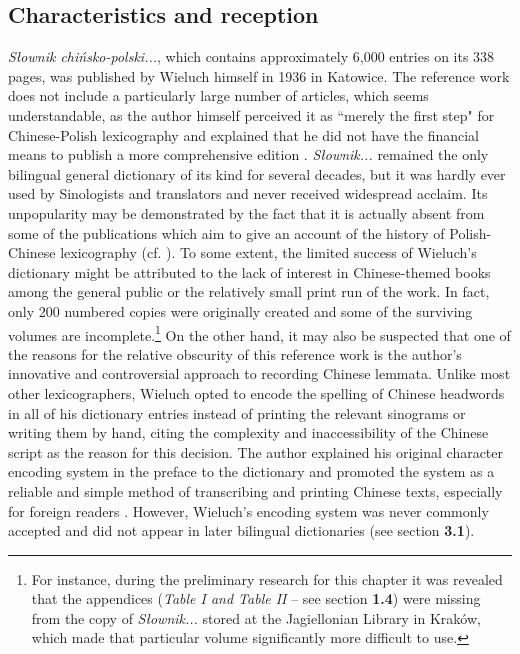 \documentclass[output=paper,colorlinks,citecolor=brown,arabicfont,chinesefont]{langscibook}
\begin{document}
\subsection{Characteristics and reception}

\emph{Słownik chińsko-polski...}, which contains approximately 6,000 entries on its 338 pages, was published by Wieluch himself in 1936 in Katowice. The reference work does not include a particularly large number of articles, which seems understandable, as the author himself perceived it as “merely the first step" for Chinese-Polish lexicography \citep[14\textsubscript{p}]{Wieluch1936} and explained that he did not have the financial means to publish a more comprehensive edition \citep[3\textsubscript{p}]{Wieluch1936}. \emph{Słownik...} remained the only bilingual general dictionary of its kind for several decades, but it was hardly ever used by Sinologists and translators and never received widespread acclaim. Its unpopularity may be demonstrated by the fact that it is actually absent from some of the publications which aim to give an account of the history of Polish-Chinese lexicography (cf. \citealt{Sroka-gradziel2018}). To some extent, the limited success of Wieluch's dictionary might be attributed to the lack of interest in Chinese-themed books among the general public or the relatively small print run of the work. In fact, only 200 numbered copies were originally created and some of the surviving volumes are incomplete.\footnote{For instance, during the preliminary research for this chapter it was revealed that the appendices (\emph{Table I and Table II} – see section \textbf{1.4}) were missing from the copy of \emph{Słownik...} stored at the Jagiellonian Library in Kraków, which made that particular volume significantly more difficult to use.
}  On the other hand, it may also be suspected that one of the reasons for the relative obscurity of this reference work is the author's innovative and controversial approach to recording Chinese lemmata. Unlike most other lexicographers, Wieluch opted to encode the spelling of Chinese headwords in all of his dictionary entries instead of printing the relevant sinograms or writing them by hand, citing the complexity and inaccessibility of the Chinese script as the reason for this decision. The author explained his original character encoding system in the preface to the dictionary and promoted the system as a reliable and simple method of transcribing and printing Chinese texts, especially for foreign readers \citep[1-3\textsubscript{p}]{Wieluch1936}. However, Wieluch's encoding system was never commonly accepted and did not appear in later bilingual dictionaries (see section \textbf{3.1}).
\end{document}
